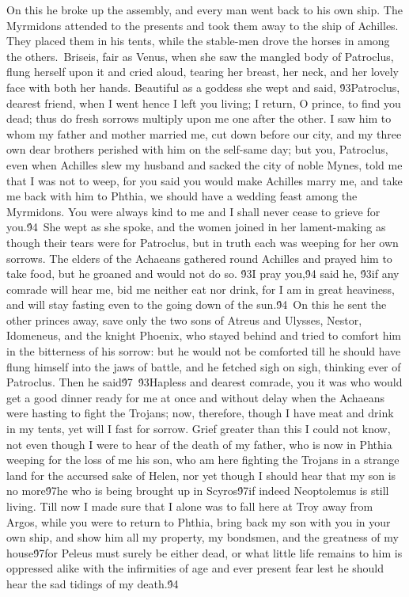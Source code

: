 {On this he broke up the assembly, and every man went back to his own ship. The Myrmidons attended to the presents and took them away to the ship of Achilles. They placed them in his tents, while the stable-men drove the horses in among the others.\
Briseis, fair as Venus, when she saw the mangled body of Patroclus, flung herself upon it and cried aloud, tearing her breast, her neck, and her lovely face with both her hands. Beautiful as a goddess she wept and said, \'93Patroclus, dearest friend, when I went hence I left you living; I return, O prince, to find you dead; thus do fresh sorrows multiply upon me one after the other. I saw him to whom my father and mother married me, cut down before our city, and my three own dear brothers perished with him on the self-same day; but you, Patroclus, even when Achilles slew my husband and sacked the city of noble Mynes, told me that I was not to weep, for you said you would make Achilles marry me, and take me back with him to Phthia, we should have a wedding feast among the Myrmidons. You were always kind to me and I shall never cease to grieve for you.\'94\
She wept as she spoke, and the women joined in her lament-making as though their tears were for Patroclus, but in truth each was weeping for her own sorrows. The elders of the Achaeans gathered round Achilles and prayed him to take food, but he groaned and would not do so. \'93I pray you,\'94 said he, \'93if any comrade will hear me, bid me neither eat nor drink, for I am in great heaviness, and will stay fasting even to the going down of the sun.\'94\
On this he sent the other princes away, save only the two sons of Atreus and Ulysses, Nestor, Idomeneus, and the knight Phoenix, who stayed behind and tried to comfort him in the bitterness of his sorrow: but he would not be comforted till he should have flung himself into the jaws of battle, and he fetched sigh on sigh, thinking ever of Patroclus. Then he said\'97\
\'93Hapless and dearest comrade, you it was who would get a good dinner ready for me at once and without delay when the Achaeans were hasting to fight the Trojans; now, therefore, though I have meat and drink in my tents, yet will I fast for sorrow. Grief greater than this I could not know, not even though I were to hear of the death of my father, who is now in Phthia weeping for the loss of me his son, who am here fighting the Trojans in a strange land for the accursed sake of Helen, nor yet though I should hear that my son is no more\'97he who is being brought up in Scyros\'97if indeed Neoptolemus is still living. Till now I made sure that I alone was to fall here at Troy away from Argos, while you were to return to Phthia, bring back my son with you in your own ship, and show him all my property, my bondsmen, and the greatness of my house\'97for Peleus must surely be either dead, or what little life remains to him is oppressed alike with the infirmities of age and ever present fear lest he should hear the sad tidings of my death.\'94\
}
